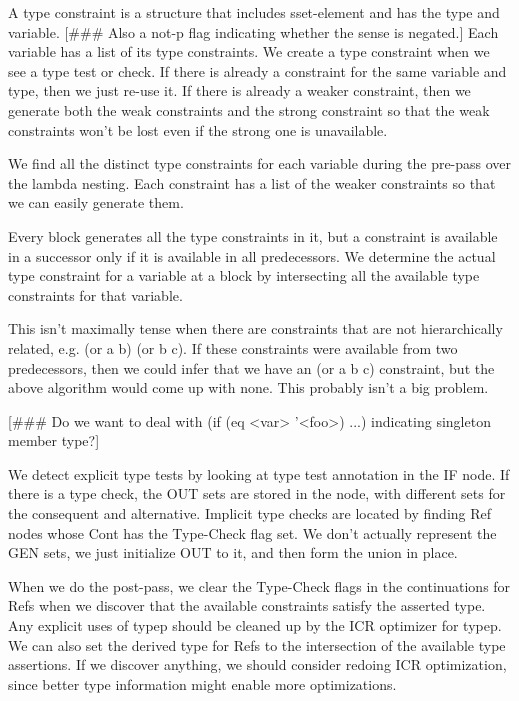 A type constraint is a structure that includes sset-element and has the type
and variable.  
[\#\#\# Also a not-p flag indicating whether the sense is negated.]
  Each variable has a list of its type constraints.  We create a
type constraint when we see a type test or check.  If there is already a
constraint for the same variable and type, then we just re-use it.  If there is
already a weaker constraint, then we generate both the weak constraints and the
strong constraint so that the weak constraints won't be lost even if the strong
one is unavailable.

We find all the distinct type constraints for each variable during the pre-pass
over the lambda nesting.  Each constraint has a list of the weaker constraints
so that we can easily generate them.

Every block generates all the type constraints in it, but a constraint is
available in a successor only if it is available in all predecessors.  We
determine the actual type constraint for a variable at a block by intersecting
all the available type constraints for that variable.

This isn't maximally tense when there are constraints that are not
hierarchically related, e.g. (or a b) (or b c).  If these constraints were
available from two predecessors, then we could infer that we have an (or a b c)
constraint, but the above algorithm would come up with none.  This probably
isn't a big problem.

[\#\#\# Do we want to deal with (if (eq <var> '<foo>) ...) indicating singleton
member type?]

We detect explicit type tests by looking at type test annotation in the IF
node.  If there is a type check, the OUT sets are stored in the node, with
different sets for the consequent and alternative.  Implicit type checks are
located by finding Ref nodes whose Cont has the Type-Check flag set.  We don't
actually represent the GEN sets, we just initialize OUT to it, and then form
the union in place.

When we do the post-pass, we clear the Type-Check flags in the continuations
for Refs when we discover that the available constraints satisfy the asserted
type.  Any explicit uses of typep should be cleaned up by the ICR optimizer for
typep.  We can also set the derived type for Refs to the intersection of the
available type assertions.  If we discover anything, we should consider redoing
ICR optimization, since better type information might enable more
optimizations.


